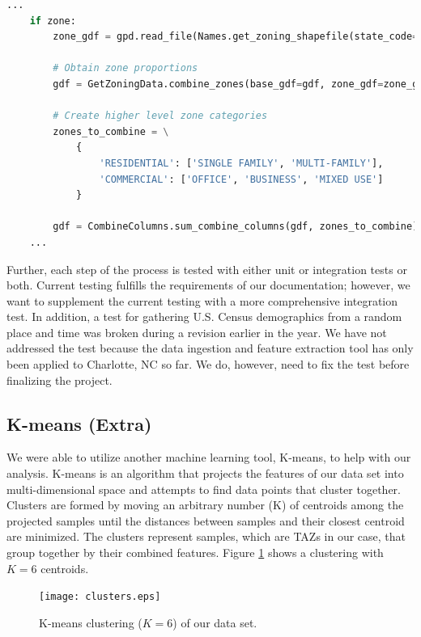 \documentclass[onecolumn, draftclsnofoot,10pt, compsoc]{IEEEtran}
\begin{document}
\begin{singlespace}
\begin{lstlisting}[language=Python, caption={Inserting the new zone-combination module into the pipeline.}, label={lst:pipeline}, captionpos=b]
    ...
    if zone:
        zone_gdf = gpd.read_file(Names.get_zoning_shapefile(state_code=state_code,                                      county_code=county_code, year=year))
        
        # Obtain zone proportions
        gdf = GetZoningData.combine_zones(base_gdf=gdf, zone_gdf=zone_gdf, base_shp_col=base_shape)

        # Create higher level zone categories
        zones_to_combine = \
            {
                'RESIDENTIAL': ['SINGLE FAMILY', 'MULTI-FAMILY'],
                'COMMERCIAL': ['OFFICE', 'BUSINESS', 'MIXED USE']
            }

        gdf = CombineColumns.sum_combine_columns(gdf, zones_to_combine)
    ...
\end{lstlisting}

Further, each step of the process is tested with either unit or integration tests or both. 
Current testing fulfills the requirements of our documentation; however, we want to supplement the current testing with a more comprehensive integration test. In addition, a test for gathering U.S. Census demographics from a random place and time was broken during a revision earlier in the year. We have not addressed the test because the data ingestion and feature extraction tool has only been applied to Charlotte, NC so far. We do, however, need to fix the test before finalizing the project.


\subsection{K-means (Extra)}
We were able to utilize another machine learning tool, K-means, to help with our analysis. K-means is an algorithm that projects the features of our data set into multi-dimensional space and attempts to find data points that cluster together. Clusters are formed by moving an arbitrary number (K) of centroids among the projected samples until the distances between samples and their closest centroid are minimized. The clusters represent samples, which are TAZs in our case, that group together by their combined features. Figure \ref{fig:clusters} shows a clustering with $K = 6$ centroids.

\begin{figure}[h!]
    \centering
    \texttt{[image: clusters.eps]}
    \caption{K-means clustering ($K=6$) of our data set.}
    \label{fig:clusters}
\end{figure}


\end{singlespace}
\end{document}
